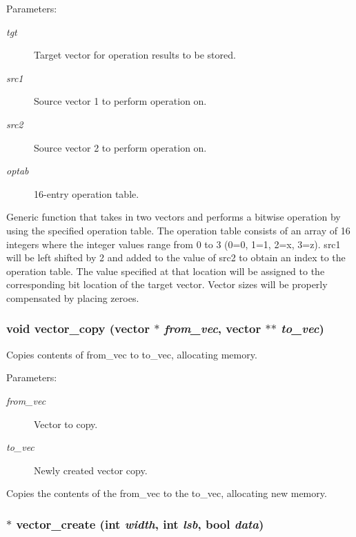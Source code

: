 \begin{Desc}
\item[Parameters: ]\par
\begin{description}
\item[{\em 
tgt}]Target vector for operation results to be stored. \item[{\em 
src1}]Source vector 1 to perform operation on. \item[{\em 
src2}]Source vector 2 to perform operation on. \item[{\em 
optab}]16-entry operation table.\end{description}
\end{Desc}
Generic function that takes in two vectors and performs a bitwise operation by using the specified operation table. The operation table consists of an array of 16 integers where the integer values range from 0 to 3 (0=0, 1=1, 2=x, 3=z). src1 will be left shifted by 2 and added to the value of src2 to obtain an index to the operation table. The value specified at that location will be assigned to the corresponding bit location of the target vector. Vector sizes will be properly compensated by placing zeroes. 
\subsubsection{\setlength{\rightskip}{0pt plus 5cm}void vector\_\-copy ({\bf vector} $\ast$ {\em from\_\-vec}, {\bf vector} $\ast$$\ast$ {\em to\_\-vec})}\label{vector_8c_a10}


Copies contents of from\_\-vec to to\_\-vec, allocating memory.

\begin{Desc}
\item[Parameters: ]\par
\begin{description}
\item[{\em 
from\_\-vec}]Vector to copy. \item[{\em 
to\_\-vec}]Newly created vector copy.\end{description}
\end{Desc}
Copies the contents of the from\_\-vec to the to\_\-vec, allocating new memory. 
\subsubsection{$\ast$ vector\_\-create (int {\em width}, int {\em lsb}, {\bf bool} {\em data})}\label{vector_8c_a9}


